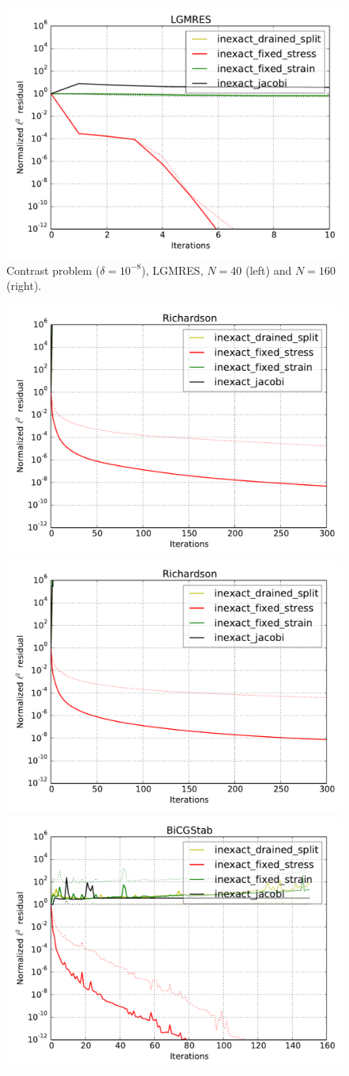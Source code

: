\documentclass{article}
\begin{document}
\begin{figure}
\begin{center}
\includegraphics[width=0.49\linewidth]{../new-LGMRES,problem=1,exact=0,N=160,cycles=1.pdf}
\caption{Contrast problem ($\delta=10^{-8}$), LGMRES, $N=40$ (left) and $N=160$ (right).}
\label{contrast12-lgmres}
\end{center}
\end{figure}

\begin{figure}
\begin{center}
\includegraphics[width=0.49\linewidth]{../new-Richardson,problem=12,exact=0,N=40,cycles=1.pdf}
\includegraphics[width=0.49\linewidth]{../new-Richardson,problem=12,exact=0,N=160,cycles=1.pdf}
\includegraphics[width=0.49\linewidth]{../new-BiCGStab,problem=12,exact=0,N=40,cycles=1.pdf}

\end{center}
\end{figure}
\end{document}

